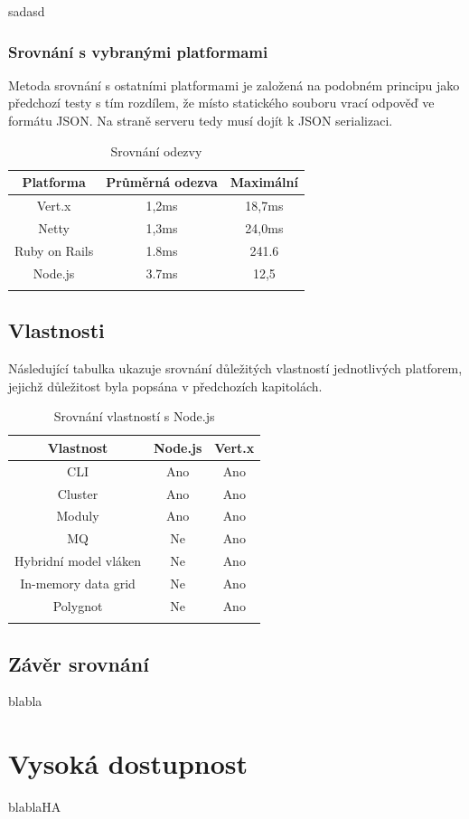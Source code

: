 sadasd

\subsubsection{Srovnání s vybranými platformami}

Metoda srovnání s ostatními platformami je založená na podobném principu jako předchozí testy s tím rozdílem, že místo statického souboru vrací odpověď ve formátu JSON. Na straně serveru tedy musí dojít k JSON serializaci.

\begin{flushleft}
\begin{longtable}{|c|c|c|}
\hline
\textsf{\textbf{Platforma}} & \textsf{\textbf{Průměrná odezva}} & \textsf{\textbf{Maximální}}\tabularnewline
\hline
Vert.x & 1,2ms & 18,7ms\tabularnewline
\hline 
Netty & 1,3ms & 24,0ms\tabularnewline
\hline
Ruby on Rails & 1.8ms & 241.6\tabularnewline
\hline 
Node.js & 3.7ms & 12,5\tabularnewline
\hline 

\caption{Srovnání odezvy}
\end{longtable}
\par\end{flushleft}

\subsection{Vlastnosti}

Následující tabulka ukazuje srovnání důležitých vlastností jednotlivých platforem, jejichž důležitost byla popsána v předchozích kapitolách.

\begin{flushleft}
\begin{longtable}{|c|c|c|}
\hline
\textsf{\textbf{Vlastnost}} & \textsf{\textbf{Node.js}} & \textsf{\textbf{Vert.x}}\tabularnewline
\hline
CLI & Ano & Ano\tabularnewline
\hline 
Cluster & Ano & Ano\tabularnewline
\hline
Moduly & Ano & Ano\tabularnewline
\hline 
MQ & Ne & Ano\tabularnewline
\hline 
Hybridní model vláken & Ne & Ano\tabularnewline
\hline 
In-memory data grid & Ne & Ano\tabularnewline
\hline 
Polygnot & Ne & Ano\tabularnewline
\hline

\caption{Srovnání vlastností s Node.js}

\end{longtable}
\par\end{flushleft}

\subsection{Závěr srovnání}

blabla

\section{Vysoká dostupnost}

blablaHA
